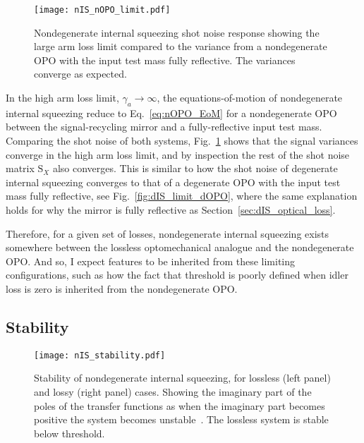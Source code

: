 \begin{figure}
	\centering
	\texttt{[image: nIS\_nOPO\_limit.pdf]}
	\caption{  Nondegenerate internal squeezing shot noise response showing the large arm loss limit compared to the variance from a nondegenerate OPO with the input test mass fully reflective. The variances converge as expected.}
	\label{fig:nIS_signal_nOPO_limit}
\end{figure}

In the high arm loss limit, $\gamma_a\rightarrow\infty$, the equations-of-motion of nondegenerate internal squeezing reduce to Eq.~\ref{eq:nOPO_EoM} for a nondegenerate OPO between the signal-recycling mirror and a fully-reflective input test mass. Comparing the shot noise of both systems, Fig.~\ref{fig:nIS_signal_nOPO_limit} shows that the signal variances converge in the high arm loss limit, and by inspection the rest of the shot noise matrix $\text{S}_X$ also converges. This is similar to how the shot noise of degenerate internal squeezing converges to that of a degenerate OPO with the input test mass fully reflective, see Fig.~\ref{fig:dIS_limit_dOPO}, where the same explanation holds for why the mirror is fully reflective as Section~\ref{sec:dIS_optical_loss}. 

Therefore, for a given set of losses, nondegenerate internal squeezing exists somewhere between the lossless optomechanical analogue and the nondegenerate OPO. And so, I expect features to be inherited from these limiting configurations, such as how the fact that threshold is poorly defined when idler loss is zero is inherited from the nondegenerate OPO.


\subsection{Stability}
\label{sec:nIS_stability}

\begin{figure}
	\centering
	\texttt{[image: nIS\_stability.pdf]}
	\caption{  Stability of nondegenerate internal squeezing, for lossless (left panel) and lossy (right panel) cases. Showing the imaginary part of the poles of the transfer functions as when the imaginary part becomes positive the system becomes unstable~\cite{}. The lossless system is stable below threshold. }
	\label{fig:nIS_stability}
\end{figure}

